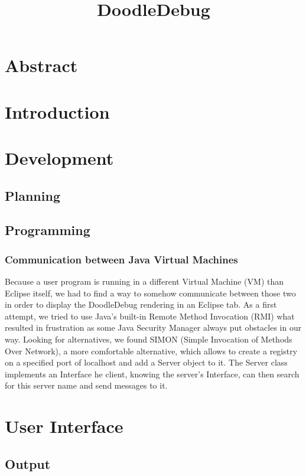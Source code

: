 \documentclass{report}
\title{DoodleDebug}
\begin{document}
\maketitle

\chapter*{Abstract}

\chapter*{Introduction}

\chapter*{Development}
\section*{Planning}

\section*{Programming}
\subsection*{Communication between Java Virtual Machines}
Because a user program is running in a different Virtual Machine (VM) than Eclipse itself, we had to find a way to somehow communicate between those two in order to display the DoodleDebug rendering in an Eclipse tab. As a first attempt, we tried to use Java's built-in Remote Method Invocation (RMI) what resulted in frustration as some Java Security Manager always put obstacles in our way. Looking for alternatives, we found SIMON (Simple Invocation of Methods Over Network), a more comfortable alternative, which allows to create a registry on a specified port of localhost and add a Server object to it. The Server class implements an Interface he client, knowing the server's Interface, can then search for this server name and send messages to it.

\chapter*{User Interface}
\section*{Output}
\end{document}
